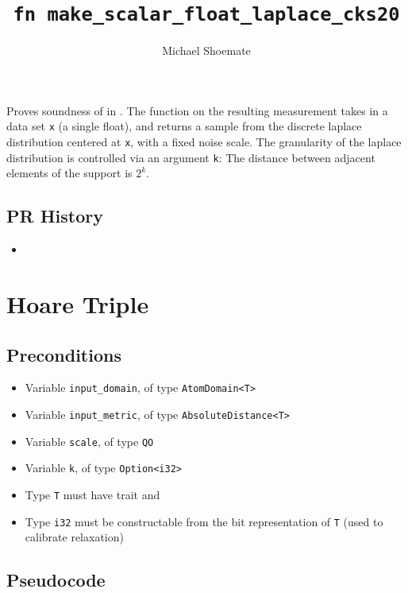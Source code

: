 \documentclass{article}
\title{\texttt{fn make\_scalar\_float\_laplace\_cks20}}
\author{Michael Shoemate}
\begin{document}
\maketitle

\contrib

Proves soundness of  in .
The function on the resulting measurement takes in a data set \texttt{x} (a single float), 
and returns a sample from the discrete laplace distribution centered at \texttt{x}, with a fixed noise scale.
The granularity of the laplace distribution is controlled via an argument \texttt{k}:
The distance between adjacent elements of the support is $2^k$.

\subsection*{PR History}
\begin{itemize}
    \item {}
\end{itemize}

\section{Hoare Triple}

\subsection*{Preconditions}
\begin{itemize}
    \item Variable \texttt{input\_domain}, of type \texttt{AtomDomain<T>}
    \item Variable \texttt{input\_metric}, of type \texttt{AbsoluteDistance<T>}
    \item Variable \texttt{scale}, of type \texttt{QO}
    \item Variable \texttt{k}, of type \texttt{Option<i32>}
    \item Type \texttt{T} must have trait  and 
    \item Type \texttt{i32} must be constructable from the bit representation of \texttt{T} (used to calibrate relaxation)
\end{itemize}

\subsection*{Pseudocode}

\end{document}
